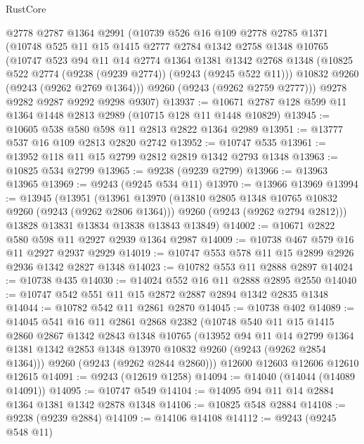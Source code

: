 \begin{lexlean}{RustCore}
\begin{coremodule}
    @2778
    @2787
    @1364
    @2991
    (@10739
      @526
      @16
      @109
      @2778
      @2785
      @1371
      (@10748
        @525
        @11
        @15
        @1415
        @2777
        @2784
        @1342
        @2758
        @1348
        @10765
        (@10747
          @523
          @94
          @11
          @14
          @2774
          @1364
          @1381
          @1342
          @2768
          @1348
          (@10825 @522 @2774 (@9238 (@9239 @2774)) (@9243 (@9245 @522 @11)))
          @10832
          @9260
          (@9243 (@9262 @2769 @1364)))
        @9260
        (@9243 (@9262 @2759 @2777)))
      @9278
      @9282
      @9287
      @9292
      @9298
      @9307)
@13937 := @10671 @2787 @128 @599 @11 @1364 @1448 @2813 @2989 (@10715 @128 @11 @1448 @10829)
@13945 := @10605 @538 @580 @598 @11 @2813 @2822 @1364 @2989
@13951 := @13777 @537 @16 @109 @2813 @2820 @2742
@13952 := @10747 @535
@13961 := @13952 @118 @11 @15 @2799 @2812 @2819 @1342 @2793 @1348
@13963 := @10825 @534 @2799
@13965 := @9238 (@9239 @2799)
@13966 := @13963 @13965
@13969 := @9243 (@9245 @534 @11)
@13970 := @13966 @13969
@13994 := @13945
    (@13951
      (@13961
        @13970
        (@13810 @2805 @1348 @10765 @10832 @9260 (@9243 (@9262 @2806 @1364)))
        @9260
        (@9243 (@9262 @2794 @2812)))
      @13828
      @13831
      @13834
      @13838
      @13843
      @13849)
@14002 := @10671 @2822 @580 @598 @11 @2927 @2939 @1364 @2987
@14009 := @10738 @467 @579 @16 @11 @2927 @2937 @2929
@14019 := @10747 @553 @578 @11 @15 @2899 @2926 @2936 @1342 @2827 @1348
@14023 := @10782 @553 @11 @2888 @2897
@14024 := @10738 @435
@14030 := @14024 @552 @16 @11 @2888 @2895 @2550
@14040 := @10747 @542 @551 @11 @15 @2872 @2887 @2894 @1342 @2835 @1348
@14044 := @10782 @542 @11 @2861 @2870
@14045 := @10738 @402
@14089 := @14045
    @541
    @16
    @11
    @2861
    @2868
    @2382
    (@10748
      @540
      @11
      @15
      @1415
      @2860
      @2867
      @1342
      @2843
      @1348
      @10765
      (@13952
        @94
        @11
        @14
        @2799
        @1364
        @1381
        @1342
        @2853
        @1348
        @13970
        @10832
        @9260
        (@9243 (@9262 @2854 @1364)))
      @9260
      (@9243 (@9262 @2844 @2860)))
    @12600
    @12603
    @12606
    @12610
    @12615
@14091 := @9243 (@12619 @1258)
@14094 := @14040 (@14044 (@14089 @14091))
@14095 := @10747 @549
@14104 := @14095 @94 @11 @14 @2884 @1364 @1381 @1342 @2878 @1348
@14106 := @10825 @548 @2884
@14108 := @9238 (@9239 @2884)
@14109 := @14106 @14108
@14112 := @9243 (@9245 @548 @11)

\end{coremodule}
\end{lexlean}
